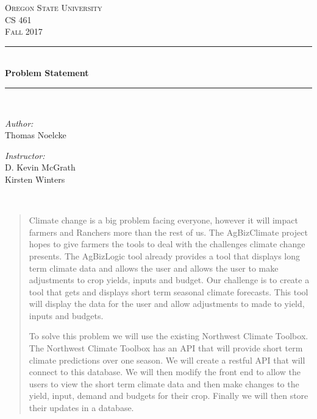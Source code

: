 \documentclass[letterpaper,10pt]{article}
\begin{document}
    \begin{titlepage}
    \newcommand{\HRule}{\rule{\linewidth}{0.5mm}}
    \center
    \textsc{\Large Oregon State University}\\[1.5cm]
    \textsc{\Large CS 461}\\[0.5cm]
    \textsc{\Large Fall 2017}\\[0.5cm]
    \HRule \\[0.4cm]
    { \huge \bfseries Problem Statement}\\[0.4cm] %
    \HRule \\[1.5cm]
    \begin{minipage}{0.4\textwidth}
        \begin{flushleft} \large
        \emph{Author:}\\
        Thomas Noelcke
        \end{flushleft}
    \end{minipage}
    \begin{minipage}{0.4\textwidth}
        \begin{flushright} \large
        \emph{Instructor:} \\
        D. Kevin McGrath\\
        Kirsten Winters
        \end{flushright}
    \end{minipage}\\[2cm]
    \begin{abstract}
    \item 
		Climate change is a big problem facing everyone, however it will impact farmers and Ranchers more than the rest of us. The AgBizClimate project hopes to give farmers the tools to deal with the challenges climate change presents. The AgBizLogic tool already provides a tool that displays long term climate data and allows the user and allows the user to make adjustments to crop yields, inputs and budget. Our challenge is to create a tool that gets and displays short term seasonal climate forecasts. This tool will display the data for the user and allow adjustments to made to yield, inputs and budgets.
			
			To solve this problem we will use the existing Northwest Climate Toolbox. The Northwest Climate Toolbox has an API that will provide short term climate predictions over one season. We will create a restful API that will connect to this database. We will then modify the front end to allow the users to view the short term climate data and then make changes to the yield, input, demand and budgets for their crop. Finally we will then store their updates in a database.

    \end{abstract}
    \vfill %
    \end{titlepage}
		
\end{document}
